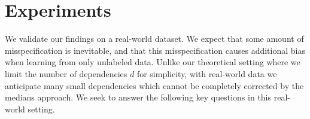 \section{Experiments} \label{sec:exp}






We validate our findings on a real-world dataset. We expect that some amount of misspecification is inevitable, and that this misspecification causes additional bias when learning from only unlabeled data. Unlike our theoretical setting where we limit the number of dependencies $d$ for simplicity, with real-world data we anticipate many small dependencies which cannot be completely corrected by the medians approach. We seek to answer the following key questions in this real-world setting.

